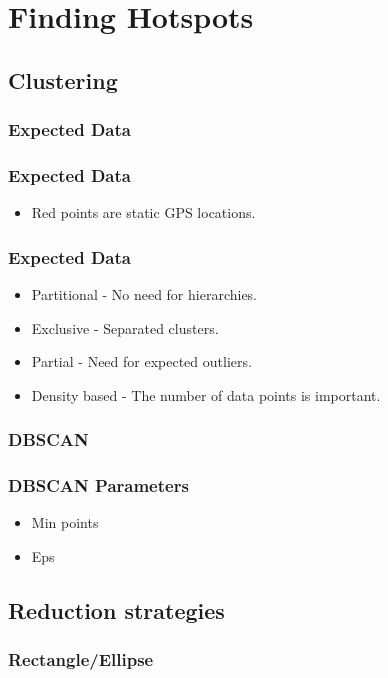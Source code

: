 \section{Finding Hotspots}

\subsection{Clustering}
\subsubsection{Expected Data}
\begin{frame}
\frametitle{Expected Data}
	\begin{itemize}
		\item Red points are static GPS locations.
	\end{itemize}
	
\end{frame}	
\begin{frame}
\frametitle{Expected Data}
	\begin{itemize}
		\item Partitional - No need for hierarchies.
		\item Exclusive - Separated clusters.
		\item Partial - Need for expected outliers.
		\item Density based - The number of data points is important.
	\end{itemize}
	
\end{frame}	
\subsubsection{DBSCAN} %
\begin{frame}
\frametitle{DBSCAN Parameters}
	\begin{itemize}
		\item Min points
		\item Eps
	\end{itemize}
\end{frame}	


\subsection{Reduction strategies}
\subsubsection{Rectangle/Ellipse}
